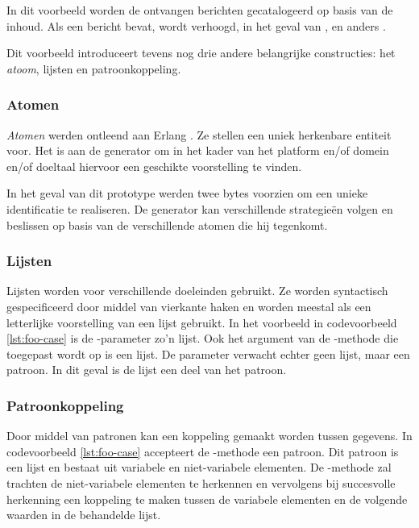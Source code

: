 In dit voorbeeld worden de ontvangen berichten gecatalogeerd op basis van de
inhoud. Als een bericht  bevat, wordt  verhoogd,
in het geval van ,  en anders .

Dit voorbeeld introduceert tevens nog drie andere belangrijke constructies: het
\emph{atoom}, lijsten en patroonkoppeling.

\vspace{-3mm}

\subsubsection{Atomen}

\emph{Atomen} werden ontleend aan Erlang \citep{armstrong1993concurrent}. Ze
stellen een uniek herkenbare entiteit voor. Het is aan de generator om in het
kader van het platform en/of domein en/of doeltaal hiervoor een geschikte
voorstelling te vinden.

In het geval van dit prototype werden twee bytes voorzien om een unieke
identificatie te realiseren. De generator kan verschillende strategie\"en
volgen en beslissen op basis van de verschillende atomen die hij tegenkomt.

\vspace{-3mm}

\subsubsection{Lijsten}

Lijsten worden voor verschillende doeleinden gebruikt. Ze worden syntactisch
gespecificeerd door middel van vierkante haken en worden meestal als een
letterlijke voorstelling van een lijst gebruikt. In het voorbeeld in
codevoorbeeld \ref{lst:foo-case} is de -parameter zo'n lijst. Ook
het argument van de -methode die toegepast wordt op 
is een lijst. De parameter verwacht echter geen lijst, maar een patroon. In dit
geval is de lijst een deel van het patroon.

\vspace{-3mm}

\subsubsection{Patroonkoppeling}

Door middel van patronen kan een koppeling gemaakt worden tussen gegevens. In
codevoorbeeld \ref{lst:foo-case} accepteert de -methode een
patroon. Dit patroon is een lijst en bestaat uit variabele en niet-variabele
elementen. De -methode zal trachten de niet-variabele elementen
te herkennen en vervolgens bij succesvolle herkenning een koppeling te maken
tussen de variabele elementen en de volgende waarden in de behandelde lijst.

